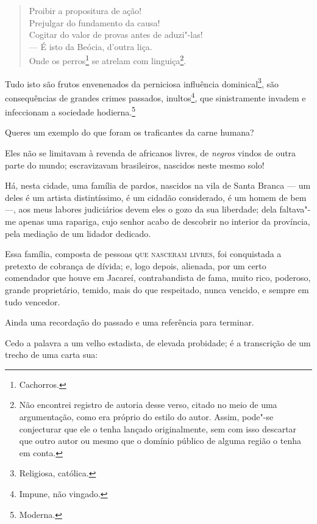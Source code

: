 \begin{verse}
Proibir a propositura de ação!\\
Prejulgar do fundamento da causa!\\
Cogitar do valor de provas antes de aduzi"-las!\\
--- É isto da Beócia, d'outra liça.\\
Onde os perros\footnote{Cachorros.} se atrelam com linguiça\footnote{
  Não encontrei registro de autoria desse verso, citado no meio de uma
  argumentação, como era próprio do estilo do autor. Assim, pode"-se
  conjecturar que ele o tenha lançado originalmente, sem com isso
  descartar que outro autor ou mesmo que o domínio público de alguma
  região o tenha em conta.}.
\end{verse}  

Tudo isto são frutos envenenados da perniciosa influência
dominical\footnote{Religiosa, católica.}, são consequências de grandes
crimes passados, inultos\footnote{Impune, não vingado.}, que
sinistramente invadem e infeccionam a sociedade hodierna.\footnote{
  Moderna.}

Queres um exemplo do que foram os traficantes da carne humana?

Eles não se limitavam à revenda de africanos livres, de \emph{negros}
vindos de outra parte do mundo; escravizavam brasileiros, nascidos neste
mesmo solo!

Há, nesta cidade, uma família de pardos, nascidos na vila de Santa
Branca --- um deles é um artista distintíssimo, é um cidadão
considerado, é um homem de bem ---, aos meus labores judiciários devem
eles o gozo da sua liberdade; dela faltava"-me apenas uma rapariga, cujo
senhor acabo de descobrir no interior da província, pela mediação de um
lidador dedicado.

Essa família, composta de pessoas \textsc{que nasceram livres}, foi conquistada a
pretexto de cobrança de dívida; e, logo depois, alienada, por um certo
comendador que houve em Jacareí, contrabandista de fama, muito rico,
poderoso, grande proprietário, temido, mais do que respeitado, nunca
vencido, e sempre em tudo vencedor.

Ainda uma recordação do passado e uma referência para terminar.

Cedo a palavra a um velho estadista, de elevada probidade; é a
transcrição de um trecho de uma carta sua:

